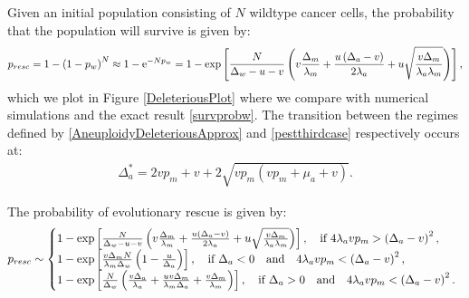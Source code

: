 \documentclass[12pt]{extarticle}
\newcommand{\e}{{\rm e}}
\begin{document}
Given an initial population consisting of $N$ wildtype cancer cells, the probability that the population will survive is given by: 
\begin{align}\label{pestthirdcase}
p_{resc}=1-\left(1-p_w\right)^N\approx 1-\e^{-Np_w}=1-\exp\left[\frac{N}{\Delta_w-u-v}\left(v\frac{\Delta_m}{\lambda_m}+\frac{u\left(\Delta_a-v\right)}{2\lambda_a}+u\sqrt{\frac{v\Delta_m}{\lambda_a\lambda_m}}\right)\right],
\end{align}
which we plot in Figure \ref{DeleteriousPlot} where we compare with numerical simulations and the exact result \eqref{survprobw}. The transition between the regimes defined by \eqref{AneuploidyDeleteriousApprox} and \eqref{pestthirdcase} respectively occurs at:
\begin{align}\label{thresholdvalueaneuploid}
\Delta_a^*=2vp_m+v+2\sqrt{vp_m\left(vp_m+\mu_a+v\right)}.
\end{align}

The probability of evolutionary rescue is given by:
\begin{equation}\label{probresc}
p_{resc}\sim\left\{
  \begin{array}{@{}ll@{}}
  1-\exp\left[\frac{N}{\Delta_w-u-v}\left(v\frac{\Delta_m}{\lambda_m}+\frac{u\left(\Delta_a-v\right)}{2\lambda_a}+u\sqrt{\frac{v\Delta_m}{\lambda_a\lambda_m}}\right)\right],\quad\text{if }4\lambda_avp_m>\left(\Delta_a-v\right)^2,\\
   1-\exp\left[\frac{v\Delta_mN}{\lambda_m\Delta_w}\left(1-\frac{u}{\Delta_a}\right)\right],\quad\text{if }\Delta_a<0\quad\text{and}\quad4\lambda_avp_m<\left(\Delta_a-v\right)^2,\\
   1-\exp\left[\frac{N}{\Delta_w}\left(\frac{v\Delta_a}{\lambda_a}+\frac{uv\Delta_m}{\lambda_m\Delta_a}+\frac{v\Delta_m}{\lambda_m}\right)\right],\quad\text{if }\Delta_a>0\quad\text{and}\quad4\lambda_avp_m<\left(\Delta_a-v\right)^2.
  \end{array}\right.
\end{equation}

\end{document}
